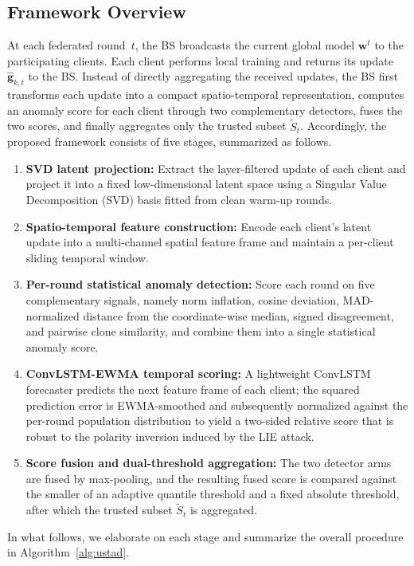 \documentclass[journal]{IEEEtran}
\begin{document}
\subsection{Framework Overview}

At each federated round~$t$, the BS broadcasts the current global model $\mathbf{w}^t$ to the participating clients. Each client performs local training and returns its update $\hat{\mathbf{g}}_{k,t}$ to the BS. Instead of directly aggregating the received updates, the BS first transforms each update into a compact spatio-temporal representation, computes an anomaly score for each client through two complementary detectors, fuses the two scores, and finally aggregates only the trusted subset $\widetilde{S}_t$. Accordingly, the proposed framework consists of five stages, summarized as follows.
\begin{enumerate}
    \item \textbf{SVD latent projection:} Extract the layer-filtered update of each client and project it into a fixed low-dimensional latent space using a Singular Value Decomposition (SVD) basis fitted from clean warm-up rounds.
    \item \textbf{Spatio-temporal feature construction:} Encode each client's latent update into a multi-channel spatial feature frame and maintain a per-client sliding temporal window.
    \item \textbf{Per-round statistical anomaly detection:} Score each round on five complementary signals, namely norm inflation, cosine deviation, MAD-normalized distance from the coordinate-wise median, signed disagreement, and pairwise clone similarity, and combine them into a single statistical anomaly score.
    \item \textbf{ConvLSTM-EWMA temporal scoring:} A lightweight ConvLSTM forecaster predicts the next feature frame of each client; the squared prediction error is EWMA-smoothed and subsequently normalized against the per-round population distribution to yield a two-sided relative score that is robust to the polarity inversion induced by the LIE attack.
    \item \textbf{Score fusion and dual-threshold aggregation:} The two detector arms are fused by max-pooling, and the resulting fused score is compared against the smaller of an adaptive quantile threshold and a fixed absolute threshold, after which the trusted subset $\widetilde{S}_t$ is aggregated.
\end{enumerate}

In what follows, we elaborate on each stage and summarize the overall procedure in Algorithm~\ref{alg:ustad}.
\end{document}
